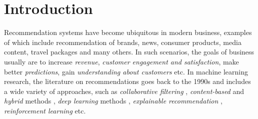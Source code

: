 \section{Introduction}

Recommendation systems have become ubiquitous in modern business, 
examples of which include recommendation of brands, news, consumer products, media content, 
travel packages and many others. In such scenarios, the goals of business usually are to increase {\em revenue},
{\em customer engagement and satisfaction}, make better {\em predictions}, 
gain {\em understanding about customers} etc.
In machine learning research, the literature on recommendations goes back to the 1990s \cite{Tapestry, grouplens}
and includes a wide variety of approaches, such as {\em collaborative filtering} \cite{bell_lessons,koren2009matrix,SVD++,PMF}, 
{\em content-based} and {\em hybrid} methods \cite{rendle,ffm,bpr,pairwise,multiverse}, 
{\em deep learning} methods \cite{PNN,cheng2016wide,lian2018xdeepfm,he2017neural,youtube,nvidia,survival},
 {\em explainable recommendation} \cite{explainable,rl_explainable}, {\em reinforcement learning} \cite{rl_explainable,rl,rl_negative} etc.


